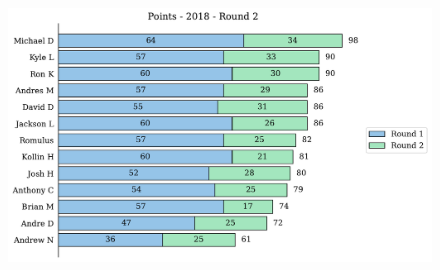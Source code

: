 \documentclass[10pt]{article}
\begin{document}
\begin{minipage}[t]{13cm}
    \begin{figure}[H]
        \vspace{-3.5cm}
        \includegraphics[width=12cm]{../../figures/2018/Points-2018-Round2.pdf}
    \end{figure}
\end{minipage}
\end{document}
